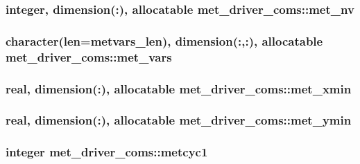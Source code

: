 \subsubsection[{met\+\_\+nv}]{\setlength{\rightskip}{0pt plus 5cm}integer, dimension(\+:), allocatable met\+\_\+driver\+\_\+coms\+::met\+\_\+nv}\label{namespacemet__driver__coms_ad177e131d2e207ace5152559e6a81e50}
\hypertarget{namespacemet__driver__coms_ac06aba05a287b0335168be56f48121ab}{}
\subsubsection[{met\+\_\+vars}]{\setlength{\rightskip}{0pt plus 5cm}character(len={\bf metvars\+\_\+len}), dimension(\+:,\+:), allocatable met\+\_\+driver\+\_\+coms\+::met\+\_\+vars}\label{namespacemet__driver__coms_ac06aba05a287b0335168be56f48121ab}
\hypertarget{namespacemet__driver__coms_a8575ea044c0d18d0281c955f3446f606}{}
\subsubsection[{met\+\_\+xmin}]{\setlength{\rightskip}{0pt plus 5cm}real, dimension(\+:), allocatable met\+\_\+driver\+\_\+coms\+::met\+\_\+xmin}\label{namespacemet__driver__coms_a8575ea044c0d18d0281c955f3446f606}
\hypertarget{namespacemet__driver__coms_af9ef42e3bc6984aedb394f464c861d2a}{}
\subsubsection[{met\+\_\+ymin}]{\setlength{\rightskip}{0pt plus 5cm}real, dimension(\+:), allocatable met\+\_\+driver\+\_\+coms\+::met\+\_\+ymin}\label{namespacemet__driver__coms_af9ef42e3bc6984aedb394f464c861d2a}
\hypertarget{namespacemet__driver__coms_a1bdb4a13bac006468d76ccc158d7d3e1}{}
\subsubsection[{metcyc1}]{\setlength{\rightskip}{0pt plus 5cm}integer met\+\_\+driver\+\_\+coms\+::metcyc1}\label{namespacemet__driver__coms_a1bdb4a13bac006468d76ccc158d7d3e1}
\hypertarget{namespacemet__driver__coms_a9a06bc94d2fbf01d6d9ef295ba9f3887}{}

